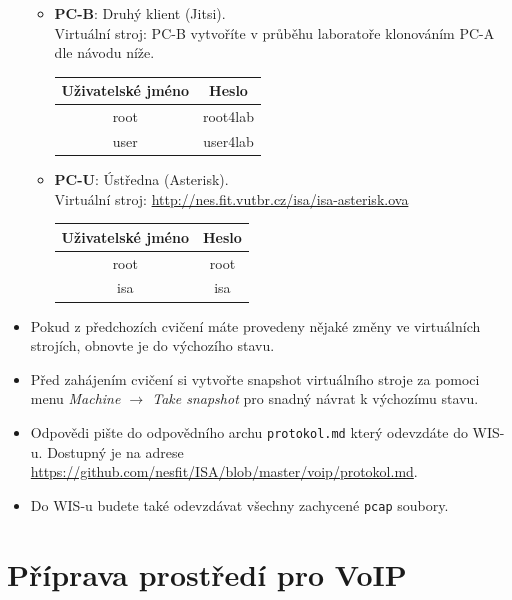 \begin{itemize}
\begin{itemize}
	\item \textbf{PC-B}: Druhý klient (Jitsi).\\
	Virtuální stroj: PC-B vytvoříte v průběhu laboratoře klonováním PC-A dle návodu níže.
	\begin{table}[H]
		\centering
		\begin{tabular}{|c|c|}
		\hline
		\textbf{Uživatelské jméno} & \textbf{Heslo} \\ \hline
		root                       & root4lab       \\ \hline
		user                       & user4lab       \\ \hline
		\end{tabular}
	\end{table}
	\item \textbf{PC-U}: Ústředna (Asterisk).\\
	Virtuální stroj: \url{http://nes.fit.vutbr.cz/isa/isa-asterisk.ova}
	\begin{table}[H]
		\centering
		\begin{tabular}{|c|c|}
		\hline
		\textbf{Uživatelské jméno} & \textbf{Heslo} \\ \hline
		root                       & root       \\ \hline
		isa                       & isa       \\ \hline
		\end{tabular}
	\end{table}
  \end{itemize}
  \item Pokud z předchozích cvičení máte provedeny nějaké změny ve virtuálních strojích, obnovte je do výchozího stavu.
  \item Před zahájením cvičení si vytvořte snapshot virtuálního stroje za pomoci
  menu \textit{Machine $\rightarrow$ Take snapshot} pro snadný návrat k výchozímu stavu.
  \item Odpovědi pište do odpovědního archu \texttt{protokol.md} který odevzdáte do WIS-u.
  Dostupný je na adrese \url{https://github.com/nesfit/ISA/blob/master/voip/protokol.md}.
  \item Do WIS-u budete také odevzdávat všechny zachycené \texttt{pcap} soubory.
\end{itemize}


\section{Příprava prostředí pro VoIP}

